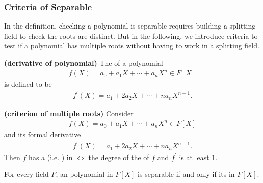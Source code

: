 \documentclass{article}
\newcommand{\bfs}[1]{\textbf{({#1}) }}
\begin{document}
\subsubsection{Criteria of Separable}
In the definition, checking a polynomial is separable requires building a splitting field to check the roots are distinct. But in the following, we introduce criteria to test if a polynomial has multiple roots without having to work in a splitting field.

\begin{defa}\bfs{derivative of polynomial}
The  of a polynomial
\begin{align*}
f(X)=a_{0}+a_{1} X+\cdots+a_{n} X^{n} \in F[X]
\end{align*}
is defined  to be  
\begin{align*}
f^{\prime}(X)=a_{1}+2 a_{2} X+\cdots+n a_{n} X^{n-1} .
\end{align*}
\end{defa}
\begin{lema}\bfs{criterion of multiple roots}\label{lem:ondzcart}
Consider
\begin{align*}
f(X)=a_{0}+a_{1} X+\cdots+a_{n} X^{n} \in F[X]
\end{align*}
and its formal derivative
\begin{align*}
f^{\prime}(X)=a_{1}+2 a_{2} X+\cdots+n a_{n} X^{n-1} .
\end{align*}
Then $f$ has a  (i.e. ) in  $\Longleftrightarrow$ the degree of the  of $f$ and $f^{\prime}$ is at least $1$.
\end{lema}

\begin{cora}\label{cor:ionadqe}
    For every field $F$, an  polynomial in $F[X]$ is separable if and only if its  in $F[X]$.
\end{cora} 
\end{document}
